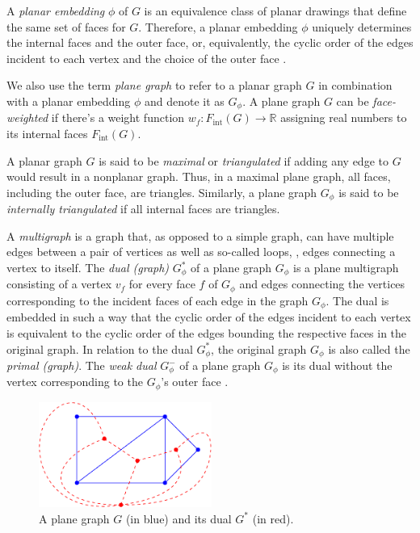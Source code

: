 A \emph{planar embedding} $\phi$ of $G$ is an equivalence class of planar drawings that define the same set of faces for $G$.
Therefore, a planar embedding $\phi$ uniquely determines the internal faces and the outer face, or, equivalently, the cyclic order of the edges incident to each vertex and the choice of the outer face \cite{angelini2015monotone}.

We also use the term \emph{plane graph} to refer to a planar graph $G$ in combination with a planar embedding $\phi$ and denote it as $G_\phi$.
A plane graph $G$ can be \emph{face-weighted} if there's a weight function $w_f \colon F_\text{int}(G) \to \mathbb{R}$ assigning real numbers to its internal faces $F_\text{int}(G)$.


A planar graph $G$ is said to be \emph{maximal} or \emph{triangulated} if adding any edge to $G$ would result in a nonplanar graph.
Thus, in a maximal plane graph, all faces, including the outer face, are triangles.
Similarly, a plane graph $G_\phi$ is said to be \emph{internally triangulated} if all internal faces are triangles.

A \emph{multigraph} is a graph that, as opposed to a simple graph, can have multiple edges between a pair of vertices as well as so-called loops, \ie{}, edges connecting a vertex to itself.
The \emph{dual (graph)} $G_\phi^*$ of a plane graph $G_\phi$ is a plane multigraph consisting of a vertex $v_f$ for every face $f$ of $G_\phi$ and edges connecting the vertices corresponding to the incident faces of each edge in the graph $G_\phi$.
The dual is embedded in such a way that the cyclic order of the edges incident to each vertex is equivalent to the cyclic order of the edges bounding the respective faces in the original graph.
In relation to the dual $G_\phi^*$, the original graph $G_\phi$ is also called the \emph{primal (graph)}.
The \emph{weak dual} $G_\phi^-$ of a plane graph $G_\phi$ is its dual without the vertex corresponding to the $G_\phi$'s outer face \cite{fleischner1974}.

\begin{figure}[H]
	\centering\includegraphics[height=130px]{Resources/Preliminaries-Dual.pdf}
	\caption{A plane graph $G$ (in blue) and its dual $G^*$ (in red).}
	\label{fig:preliminaries-dual}
\end{figure}

